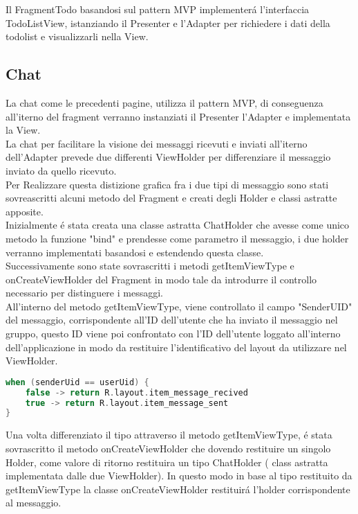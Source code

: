 Il FragmentTodo basandosi sul pattern MVP implementer\'a l'interfaccia TodoListView, istanziando il Presenter e l'Adapter per richiedere i dati della todolist e visualizzarli nella View.\\


\subsection{Chat}
La chat come le precedenti pagine, utilizza il pattern MVP, di conseguenza all'iterno del fragment verranno instanziati il Presenter l'Adapter e implementata la View.\\
La chat per facilitare la visione dei messaggi ricevuti e inviati all'iterno dell'Adapter prevede due differenti ViewHolder per differenziare il messaggio inviato da quello ricevuto.\\
Per Realizzare questa distizione grafica fra i due tipi di messaggio sono stati sovreascritti alcuni metodo del Fragment e creati degli Holder e classi astratte apposite.\\
Inizialmente \'e stata creata una classe astratta ChatHolder che avesse come unico metodo la funzione "bind" e prendesse come parametro il messaggio, i due holder verranno implementati basandosi e estendendo questa classe.\\
Successivamente sono state sovrascritti i metodi getItemViewType e onCreateViewHolder del Fragment in modo tale da introdurre il controllo necessario per distinguere i messaggi.\\
All'interno del metodo getItemViewType, viene controllato il campo "SenderUID" del messaggio, corrispondente all'ID dell'utente che ha inviato il messaggio nel gruppo, questo ID viene poi confrontato con l'ID dell'utente loggato all'interno dell'applicazione in modo da restituire l'identificativo del layout da utilizzare nel ViewHolder.
\begin{lstlisting}[language=kotlin,caption={FragmentTodo.kt}]
when (senderUid == userUid) {
    false -> return R.layout.item_message_recived
    true -> return R.layout.item_message_sent
}
\end{lstlisting}
Una volta differenziato il tipo attraverso il metodo getItemViewType, \'e stata sovrascritto il metodo onCreateViewHolder che dovendo restituire un singolo Holder, come valore di ritorno restituira un tipo ChatHolder ( class astratta implementata dalle due ViewHolder). In questo modo in base al tipo restituito da getItemViewType la classe onCreateViewHolder restituir\'a l'holder corrispondente al messaggio.
